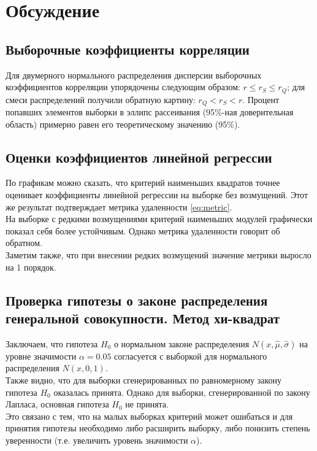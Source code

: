 \section{Обсуждение}
\subsection{Выборочные коэффициенты корреляции}
\noindent Для двумерного нормального распределения дисперсии выборочных коэффициентов корреляции упорядочены следующим образом: $r \leq r_{S} \leq r_{Q}$; для смеси распределений получили обратную картину: $r_{Q} < r_{S} < r$.
\newline
\noindent Процент попавших элементов выборки в эллипс рассеивания (95$\%$-ная доверительная область) примерно равен его теоретическому значению (95$\%$).
\subsection{Оценки коэффициентов линейной регрессии}
\noindent По графикам можно сказать, что критерий наименьших квадратов точнее оценивает коэффициенты линейной регрессии на выборке без возмущений. Этот же результат подтверждает метрика удаленности \eqref{eq:metric}. \\ 
На выборке с редкими возмущениями критерий наименьших модулей графически показал себя более устойчивым. Однако метрика удаленности говорит об обратном. \\
Заметим также, что при внесении редких возмущений значение метрики выросло на 1 порядок.

\subsection{Проверка гипотезы о законе распределения генеральной совокупности. Метод хи-квадрат}

\noindent Заключаем, что гипотеза $H_{0}$ о нормальном законе распределения $N(x,\hat{\mu}, \hat{\sigma})$ на уровне значимости $\alpha = 0.05$ согласуется с выборкой для нормального распределения $N(x, 0, 1)$.
\\
Также видно, что для выборки сгенерированных по равномерному закону гипотеза $H_{0}$ оказалась принята. Однако для выборки, сгенерированной по закону Лапласа, основная гипотеза  $H_{0}$ не принята. \\ 
Это связано с тем, что на малых выборках критерий может ошибаться и для принятия гипотезы необходимо либо расширить выборку, либо понизить степень уверенности (т.е. увеличить уровень значимости $\alpha$).

